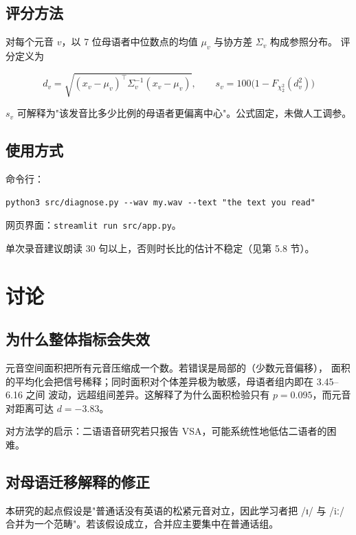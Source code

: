 \documentclass[11pt,a4paper]{ctexart}
\newcommand{\ipa}[1]{/#1/}
\begin{document}
\subsection{评分方法}

对每个元音 $v$，以 7 位母语者中位数点的均值 $\mu_v$ 与协方差 $\Sigma_v$ 构成参照分布。
评分定义为

\begin{equation}
d_v = \sqrt{(x_v - \mu_v)^{\top}\Sigma_v^{-1}(x_v-\mu_v)},\qquad
s_v = 100\bigl(1 - F_{\chi^2_2}(d_v^2)\bigr)
\end{equation}

$s_v$ 可解释为"该发音比多少比例的母语者更偏离中心"。公式固定，未做人工调参。

\subsection{使用方式}

命令行：

\begin{verbatim}
python3 src/diagnose.py --wav my.wav --text "the text you read"
\end{verbatim}

网页界面：\texttt{streamlit run src/app.py}。

单次录音建议朗读 30 句以上，否则时长比的估计不稳定（见第 5.8 节）。

\section{讨论}

\subsection{为什么整体指标会失效}

元音空间面积把所有元音压缩成一个数。若错误是局部的（少数元音偏移），
面积的平均化会把信号稀释；同时面积对个体差异极为敏感，母语者组内即在 3.45--6.16 之间
波动，远超组间差异。这解释了为什么面积检验只有 $p=0.095$，而元音对距离可达 $d=-3.83$。

对方法学的启示：二语语音研究若只报告 VSA，可能系统性地低估二语者的困难。

\subsection{对母语迁移解释的修正}

本研究的起点假设是"普通话没有英语的松紧元音对立，因此学习者把 \ipa{ɪ} 与 \ipa{iː}
合并为一个范畴"。若该假设成立，合并应主要集中在普通话组。
\end{document}
